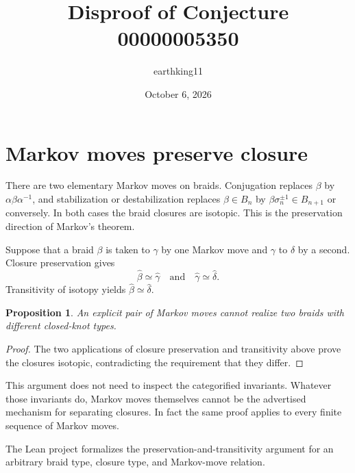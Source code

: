 \documentclass[11pt]{article}
\title{Disproof of Conjecture 00000005350}
\author{earthking11}
\date{October 6, 2026}
\newtheorem{proposition}{Proposition}
\begin{document}
\maketitle
\section*{Markov moves preserve closure}
There are two elementary Markov moves on braids.  Conjugation replaces
$\beta$ by $\alpha\beta\alpha^{-1}$, and stabilization or destabilization
replaces $\beta\in B_n$ by $\beta\sigma_n^{\pm1}\in B_{n+1}$ or conversely.
In both cases the braid closures are isotopic.  This is the preservation
direction of Markov's theorem.

Suppose that a braid $\beta$ is taken to $\gamma$ by one Markov move and
$\gamma$ to $\delta$ by a second.  Closure preservation gives
\[
 \widehat\beta\simeq\widehat\gamma
 \quad\text{and}\quad
 \widehat\gamma\simeq\widehat\delta.
\]
Transitivity of isotopy yields $\widehat\beta\simeq\widehat\delta$.

\begin{proposition}
An explicit pair of Markov moves cannot realize two braids with different
closed-knot types.
\end{proposition}
\begin{proof}
The two applications of closure preservation and transitivity above prove the
closures isotopic, contradicting the requirement that they differ.
\end{proof}

This argument does not need to inspect the categorified invariants.  Whatever
those invariants do, Markov moves themselves cannot be the advertised
mechanism for separating closures.  In fact the same proof applies to every
finite sequence of Markov moves.

The Lean project formalizes the preservation-and-transitivity argument for an
arbitrary braid type, closure type, and Markov-move relation.
\end{document}

